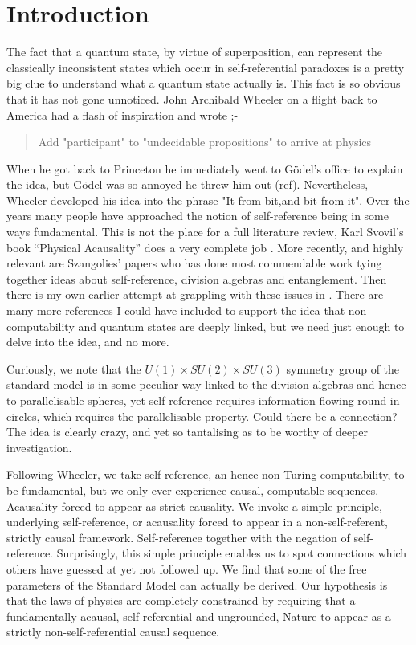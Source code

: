 \documentclass{article}
\theoremstyle{plain}
\theoremstyle{definition}
\theoremstyle{remark}\newtheorem*{remark}{Remark}
\begin{document}
\section{Introduction}
The fact that a quantum state, by virtue of superposition, can represent the classically
inconsistent states which occur in self-referential paradoxes is a pretty big clue to understand
what a quantum state actually is. This fact is so obvious that it has not gone unnoticed. John
Archibald Wheeler on a flight back to America had a flash of inspiration and wrote ;-
\begin{quotation}
Add "participant" to "undecidable propositions" to arrive at physics
  \par
\hfill \autocite{wheeler_j_1974}
\end{quotation}
When he got back to Princeton he immediately went to G\"odel's office to explain the idea, but
G\"odel was so annoyed he threw him out (ref). Nevertheless, Wheeler developed his idea into the
phrase "It from bit,and bit from it". Over the years many people have approached the notion of
self-reference being in some ways fundamental. This is not the place for a full literature
review, Karl Svovil's book \enquote{Physical Acausality} does a very complete job
\autocite{svozil_k_2018}. More recently, and highly relevant are Szangolies' papers
\autocite{szangolies_2020, szangolies_j_2018, szangolies2025standardmodel, szangolies_j_2021}
who has done most commendable work tying together ideas about self-reference, division algebras
and entanglement. Then there is my own earlier attempt at grappling with these issues 
in \autocite{small_2006}. There are
many more references I could have included to support the idea that non-computability and
quantum states are deeply linked, but we need just enough to delve into the idea, and no more.

Curiously, we note that the $U(1) \times SU(2) \times SU(3)$ symmetry group of the standard
model is in some peculiar way linked to the division algebras and hence to parallelisable
spheres, yet self-reference requires information flowing round in circles, which requires the
parallelisable property. Could there be a connection? The idea is clearly crazy, and yet so
tantalising as to be worthy of deeper investigation.

Following Wheeler, we take self-reference, an hence non-Turing computability, to be fundamental,
but we only ever experience causal, computable sequences. Acausality forced to appear as strict
causality. We invoke a simple principle, underlying self-reference, or acausality forced to appear
in a non-self-referent, strictly causal framework. Self-reference together with the negation of
self-reference. Surprisingly, this simple principle enables us to spot connections which others
have guessed at yet not followed up. We find that some of the free parameters of the Standard
Model can actually be derived. Our hypothesis is that the laws of physics are completely
constrained by requiring that a fundamentally acausal, self-referential and ungrounded, Nature
to appear as a strictly non-self-referential causal sequence.
\end{document}
